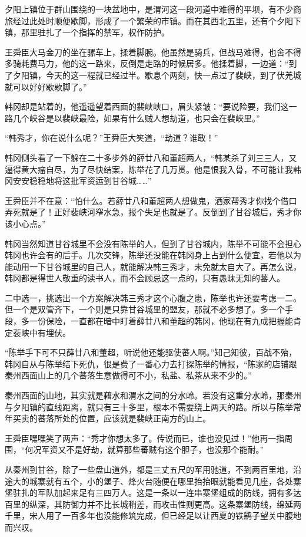 夕阳上镇位于群山围绕的一块盆地中，是渭河这一段河道中难得的平坝，有不少商旅经过此处时顺便歇脚，形成了一个繁荣的市镇。而在其西北五里，还有个夕阳下镇，那里驻扎了一个指挥的禁军，权作防护。

王舜臣大马金刀的坐在骡车上，揉着脚腕。他虽然是骑兵，但战马难得，也舍不得多骑耗费马力，他的这一路来，反倒是走路的时候居多。他揉着脚，一边道：“到了夕阳镇，今天的这一程就已经过半。歇息个两刻，快一点过了裴峡，到了伏羌城就可以好好歇歇脚了。”

韩冈却是站着的，他遥遥望着西面的裴峡峡口，眉头紧皱：“要说险要，我们这一路几个峡谷是以裴峡最险，如果有什么贼人想劫道，也只会在裴峡里。”

“韩秀才，你在说什么呢？”王舜臣大笑道，“劫道？谁敢！”

韩冈侧头看了一下躲在二十多步外的薛廿八和董超两人，“韩某杀了刘三三人，又逼得黄大瘤自尽，为了尽快结案，陈举花了几万贯。他是恨我入骨，不可能让我韩冈安安稳稳地将这批军资运到甘谷城……”

王舜臣并不在意：“怕什么。若薛廿八和董超两人想做鬼，洒家帮秀才你找个借口弄死就是了！正好裴峡河窄水急，报个失足也就是了。反倒到了甘谷城后，秀才你该小心点。”

韩冈当然知道甘谷城里不会没有陈举的人，但到了甘谷城内，陈举不可能不会担心韩冈也许会有的后手。几次交锋，陈举还没能在韩冈身上占到什么便宜，若他以为能动用一下甘谷城里的自己人，就能解决韩三秀才，未免就太自大了。再怎么说，韩冈都是得世人敬重的读书人，而不会顾忌这一点的，只有愚昧无知的蕃人。

二中选一，挑选出一个方案解决韩三秀才这个心腹之患，陈举也许还要考虑一二。但一个是双管齐下，一个则是只靠甘谷城里的盟友，那就不必多想了。多一个手段，多一份保险，一直都在暗中盯着薛廿八和董超的韩冈，他现在有九成把握能肯定裴峡中有埋伏。

“陈举手下可不只薛廿八和董超，听说他还能驱使蕃人啊。”知己知彼，百战不殆，韩冈自从与陈举结下死仇，很是费了一番心力去打探陈举的情报，“陈家的店铺跟秦州西面山上的几个蕃落生意做得可不小，私盐、私茶从来不少的。”

秦州西面的山地，其实就是藉水和渭水之间的分水岭。若没有这重分水岭，那秦州与夕阳镇的直线距离，就只有三十多里，根本不需要绕上两天的路。所以与陈举常年买卖的蕃落所处的位置，应该就是裴峡正南方的山上。

王舜臣嘿嘿笑了两声：“秀才你想太多了。传说而已，谁也没见过！”他再一指周围，“何况军资又不是好劫，就算那些蕃贼有这个胆子，也没那个能耐。”

从秦州到甘谷，除了一些盘山道外，都是三丈五尺的军用驰道，不到两百里地，沿途大的城寨就有五个，小的堡子、烽火台随便在哪里抬抬眼就能看见几座，各处寨堡驻扎的军队加起来足有三四万人。这是一条以一连串寨堡组成的防线，拥有多达百里的纵深，其防御力并不比长城稍差，而攻击性则更高。这条寨堡防线，绵延两千里，宋人用了一百多年也没能修筑完成，但已经足以让西夏的铁鹞子望关中腹地而兴叹。

